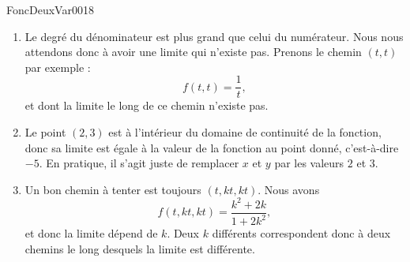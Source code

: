 
\begin{corrige}{FoncDeuxVar0018}

	\begin{enumerate}

		\item	%
			Le degré du dénominateur est plus grand que celui du numérateur. Nous nous attendons donc à avoir une limite qui n'existe pas. Prenons le chemin $(t,t)$ par exemple :
			\begin{equation}
				f(t,t)=\frac{1}{ t },
			\end{equation}
			et dont la limite le long de ce chemin n'existe pas.
		\item 	%
			Le point $(2,3)$ est à l'intérieur du domaine de continuité de la fonction, donc sa limite est égale à la valeur de la fonction au point donné, c'est-à-dire $-5$. En pratique, il s'agit juste de remplacer $x$ et $y$ par les valeurs $2$ et $3$.

		\item	%
			Un bon chemin à tenter est toujours $(t,kt,kt)$. Nous avons
			\begin{equation}
				f(t,kt,kt)=\frac{ k^2+2k }{ 1+2k^2 },
			\end{equation}
			et donc la limite dépend de $k$. Deux $k$ différents correspondent donc à deux chemins le long desquels la limite est différente.


\end{enumerate}
\end{corrige}
